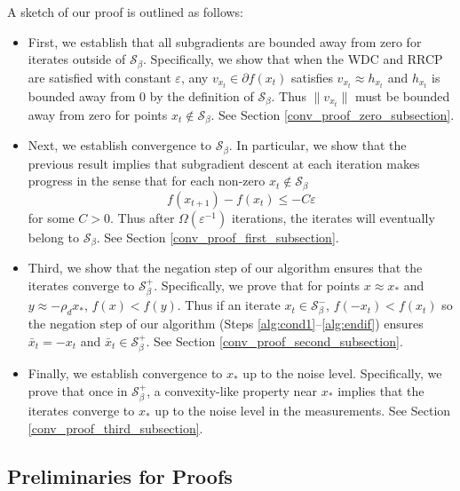 \documentclass[11pt]{article}
\renewcommand{\epsilon}{\varepsilon}
\newcommand{\Seps}{\mathcal{S}}
\theoremstyle{remark}
\begin{document}
A sketch of our proof is outlined as follows:

\begin{itemize}
    \item First, we establish that all subgradients are bounded away from zero for iterates outside of $\Seps_{\beta}$. Specifically, we show that when the WDC and RRCP are satisfied with constant $\epsilon$, any $v_{x_t} \in \partial f(x_t)$ satisfies $v_{x_t} \approx h_{x_t}$ and $h_{x_t}$ is bounded away from $0$ by the definition of $\Seps_{\beta}$. Thus $\|v_{x_t}\|$ must be bounded away from zero for points $x_t \notin \mathcal{S}_{\beta}$. See Section \ref{conv_proof_zero_subsection}.
    \item Next, we establish convergence to $\Seps_{\beta}$. In particular, we show that the previous result implies that subgradient descent at each iteration makes progress in the sense that for each non-zero $x_t \notin \mathcal{S}_{\beta}$ $$f(x_{t+1}) - f(x_t) \leqslant -C\epsilon$$ for some $C > 0$. Thus after $\Omega(\epsilon^{-1})$ iterations, the iterates will eventually belong to $\mathcal{S}_{\beta}.$ See Section \ref{conv_proof_first_subsection}.
    \item Third, we show that the negation step of our algorithm ensures that the iterates converge to $\Seps_{\beta}^+$. Specifically, we prove that for points $x \approx x_*$ and $y \approx -\rho_d x_*$, $f(x) < f(y)$. Thus if an iterate $x_t \in \mathcal{S}_{\beta}^-$, $f(-x_t) < f(x_t)$ so the negation step of our algorithm (Steps \ref{alg:cond1}--\ref{alg:endif}) ensures $\bar{x}_t = -x_t$ and $\bar{x}_t \in \mathcal{S}_{\beta}^+$. See Section \ref{conv_proof_second_subsection}.
    \item Finally, we establish convergence to $x_*$ up to the noise level. Specifically, we prove that once in $\mathcal{S}_{\beta}^+$, a convexity-like property near $x_*$ implies that the iterates converge to $x_*$ up to the noise level in the measurements. See Section \ref{conv_proof_third_subsection}.
\end{itemize} 

\subsection{Preliminaries for Proofs} \label{preliminaries}
\end{document}

